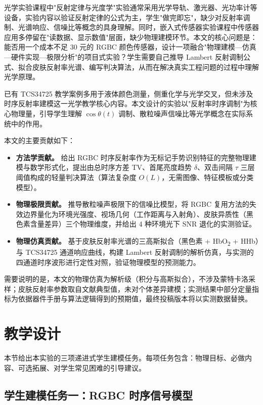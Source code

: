 \documentclass[11pt,a4paper]{ctexart}
\begin{document}
光学实验课程中"反射定律与光度学"实验通常采用光学导轨、激光器、光功率计等设备，实验内容以验证反射定律的公式为主，学生"做完即忘"，缺少对反射率调制、光谱响应、信噪比等概念的具身理解。同时，嵌入式传感器实验课程中传感器应用多停留在"读数据、显示数值"层面，缺少物理建模环节。本文的核心问题是：能否用一个成本不足 30 元的 RGBC 颜色传感器，设计一项融合"物理建模—仿真—硬件实现—极限分析"的项目式实验？学生需要自己推导 Lambert 反射调制公式、拟合皮肤反射率光谱、编写判决算法，从而在解决真实工程问题的过程中理解光学原理。

已有 TCS34725 教学案例多用于液体颜色测量，侧重化学与光学交叉，但未涉及时序反射率建模这一光学教学核心内容。本文设计的实验以"反射率时序调制"为核心物理量，引导学生理解 $\cos\theta(t)$ 调制、散粒噪声信噪比等光学概念在实际系统中的作用。

本文的主要贡献如下：
\begin{itemize}[leftmargin=1.5em]
  \item \textbf{方法学贡献。} 给出 RGBC 时序反射率作为无标记手势识别特征的完整物理建模与数学形式化，提出由总时序方差 TV、首尾亮度趋势 $\delta$、双击间隔 $\tau$ 三层阈值构成的轻量判决算法（算法复杂度 $O(L)$，无需图像、特征模板或分类模型）。
  \item \textbf{物理极限贡献。} 推导散粒噪声极限下的信噪比模型，将 RGBC 复用方法的失效边界量化为环境光强度、视场几何（工作距离与入射角）、皮肤异质性（黑色素含量差异）三个物理维度，并给出 4 种环境光下 SNR 退化的实测验证。
  \item \textbf{物理仿真贡献。} 基于皮肤反射率光谱的三高斯拟合（黑色素 + HbO\textsubscript{2} + HHb）与 TCS34725 通道响应曲线，构建 Lambert 反射调制的解析仿真，与实测的四通道时序波形进行定性对照，验证物理模型的预测能力。
\end{itemize}

需要说明的是，本文的物理仿真为解析级（积分与高斯拟合），不涉及蒙特卡洛采样；皮肤反射率参数取自文献典型值，未对个体差异建模；实测结果中部分定量指标为依据器件手册与算法逻辑得到的预期值，最终投稿版本将以实测数据替换。

\section{教学设计}
\label{sec:design}

本节给出本实验的三项递进式学生建模任务。每项任务包含：物理目标、必做内容、可选拓展、对学生常见困难的引导建议。

\subsection{学生建模任务一：RGBC 时序信号模型}
\label{sec:task1}
\end{document}
